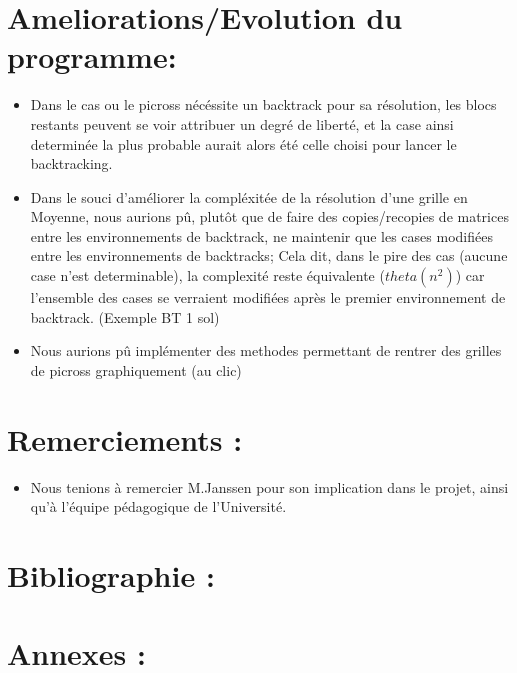 \documentclass{article}
\begin{document}
\section{Ameliorations/Evolution du programme:}
\begin{itemize}
\item Dans le cas ou le picross nécéssite un backtrack pour sa résolution, les blocs restants peuvent se voir attribuer un degré de liberté, et la case ainsi determinée la plus probable aurait alors été celle choisi pour lancer le backtracking.
\item Dans le souci d'améliorer la compléxitée de la résolution d'une grille en Moyenne, nous aurions pû, plutôt que de faire des copies/recopies de matrices entre les environnements de backtrack, ne maintenir que les cases modifiées entre les environnements de backtracks;
Cela dit, dans le pire des cas (aucune case n'est determinable), la complexité reste équivalente ($theta(n^2)$) car l'ensemble des cases se verraient modifiées après le premier environnement de backtrack. (Exemple BT 1 sol)
\item Nous aurions pû implémenter des methodes permettant de rentrer des grilles de picross graphiquement (au clic)
\end{itemize}
\section{Remerciements :}
\begin{itemize}
\item Nous tenions à remercier M.Janssen pour son implication dans le projet, ainsi qu'à l'équipe pédagogique de l'Université.
\end{itemize}
\section{Bibliographie :}
\section{Annexes :}
\end{document}
